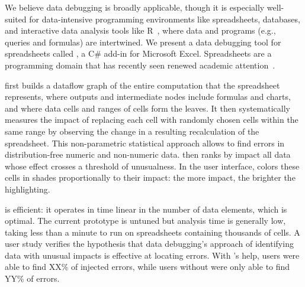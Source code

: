 We believe data debugging is broadly applicable, though it is
especially well-suited for data-intensive programming environments
like spreadsheets, databases, and interactive data analysis tools like
R~\cite{ihaka1996r}, where data and programs (e.g., queries and
formulas) are intertwined. We present a data debugging tool for
spreadsheets called \checkcell{}, a C\# add-in for Microsoft
Excel. Spreadsheets are a programming domain that has recently seen
renewed academic
attention~\cite{DBLP:conf/popl/Gulwani11,DBLP:conf/pldi/HarrisG11,Singh:2012:LSS:2212351.2212356}.

\checkcell{} first builds a dataflow graph 
of the entire computation that the spreadsheet represents, where outputs
and intermediate nodes include formulas and charts, and where data
cells and ranges of cells form the leaves. It then systematically measures the impact of
replacing each cell with randomly chosen cells within the same range
by observing the change in a resulting recalculation of the
spreadsheet. This non-parametric statistical approach
allows \checkcell{} to find errors in distribution-free numeric and
non-numeric data. \checkcell{} then ranks by impact all data whose
effect crosses a threshold of unusualness. In the user
interface, \checkcell{} colors these cells in shades proportionally to
their impact: the more impact, the brighter the highlighting.

\checkcell{} is efficient: it operates in time linear in the number
of data elements, which is optimal. The current prototype is untuned
but analysis time is generally low, taking less than a minute to run
on spreadsheets containing thousands of cells. A user study verifies
the hypothesis that data debugging's approach of identifying data with
unusual impacts is effective at locating errors. With \checkcell{}'s
help, users were able to find XX\% of injected errors, while users
without \checkcell{} were only able to find YY\% of errors.


